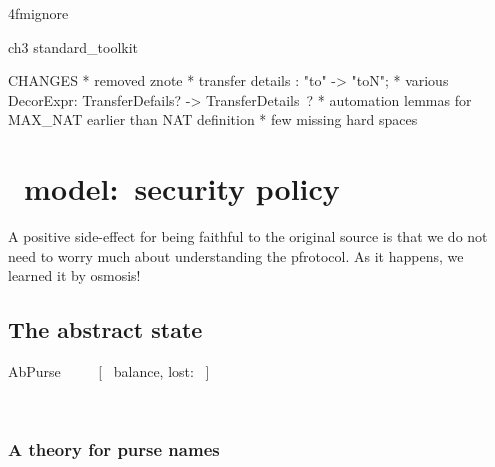 \ai4fmignore{
\begin{zsection}
  \SECTION ch3 \parents standard\_toolkit
\end{zsection}
CHANGES
* removed znote 
* transfer details :  "to" -> "toN"; 
* various DecorExpr: TransferDefails? -> TransferDetails~?
* automation lemmas for MAX_NAT earlier than NAT definition
* few missing hard spaces
}

\chapter{\Abs\ model:~security policy}\label{ch3}

A positive side-effect for being faithful to the
original source is that we do not need to worry
much about understanding the pƒrotocol. As it happens,
we learned it by osmosis!

\section{The abstract state}\label{ch3.abstractState}

\begin{LSDef}
\begin{zed}
   AbPurse ~~~~ [~ balance, lost: \nat ~]
\end{zed}~\end{LSDef}

\subsection{A theory for purse names}\label{ch3.pursenames}

